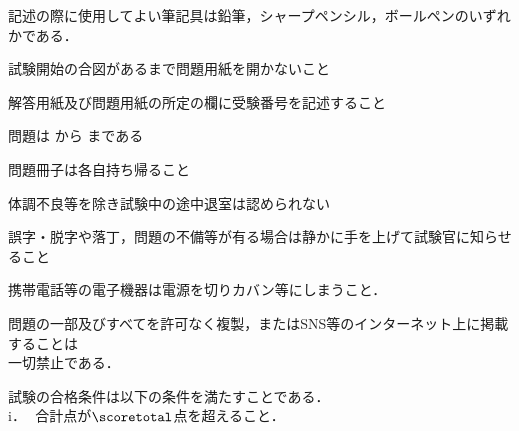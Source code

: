\item\;  記述の際に使用してよい筆記具は鉛筆，シャープペンシル，ボールペンのいずれかである．
\item\;  試験開始の合図があるまで問題用紙を開かないこと
\item\;  解答用紙及び問題用紙の所定の欄に受験番号を記述すること
\item\;  問題は\,\,から\,\fbox{\amountq}\,まである
\item\;  問題冊子は各自持ち帰ること
\item\;  体調不良等を除き試験中の途中退室は認められない
\item\;  誤字・脱字や落丁，問題の不備等が有る場合は静かに手を上げて試験官に知らせること
\item\;  携帯電話等の電子機器は電源を切りカバン等にしまうこと．
\item\;  問題の一部及びすべてを許可なく複製，またはSNS等のインターネット上に掲載することは\\[2mm]
         \hspace{0.2cm}一切禁止である．
\item\;  試験の合格条件は以下の条件を満たすことである．\\[2mm]
         \hspace{0.2cm}   i．\;\;\,\, 合計点が$\scoretotal$点を超えること．
